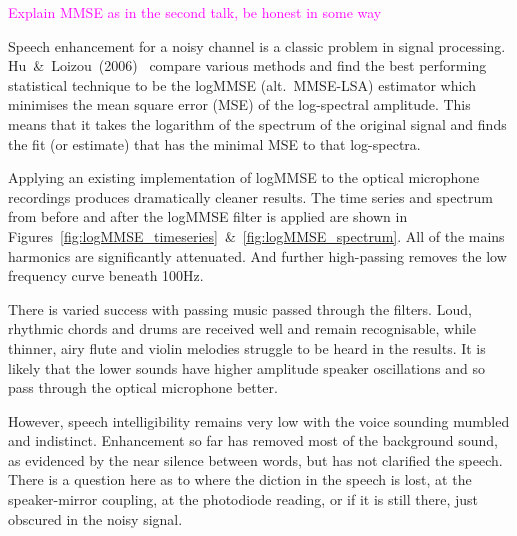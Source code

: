 \documentclass[prb,preprint]{revtex4-1}
\newcommand{\jam}{\textcolor{magenta}}
\begin{document}
\jam{Explain MMSE as in the second talk, be honest in some way}

Speech enhancement for a noisy channel is a classic problem in signal processing. Hu~\&~Loizou~(2006)~\cite{SubjectiveComparison} compare various methods and find the best performing statistical technique to be the logMMSE (alt.\ MMSE-LSA) estimator which minimises the mean square error (MSE) of the log-spectral amplitude. This means that it takes the logarithm of the spectrum of the original signal and finds the fit (or estimate) that has the minimal MSE to that log-spectra.


Applying an existing implementation of logMMSE\cite{logmmse} to the optical microphone recordings produces dramatically cleaner results. The time series and spectrum from before and after the logMMSE filter is applied are shown in Figures~\ref{fig:logMMSE_timeseries}~\&~\ref{fig:logMMSE_spectrum}. All of the mains harmonics are significantly attenuated. And further high-passing removes the low frequency curve beneath 100Hz.


There is varied success with passing music passed through the filters. Loud, rhythmic chords and drums are received well and remain recognisable, while thinner, airy flute and violin melodies struggle to be heard in the results. It is likely that the lower sounds have higher amplitude speaker oscillations and so pass through the optical microphone better.


However, speech intelligibility remains very low with the voice sounding mumbled and indistinct. Enhancement so far has removed most of the background sound, as evidenced by the near silence between words, but has not clarified the speech. There is a question here as to where the diction in the speech is lost, at the speaker-mirror coupling, at the photodiode reading, or if it is still there, just obscured in the noisy signal.

\end{document}
